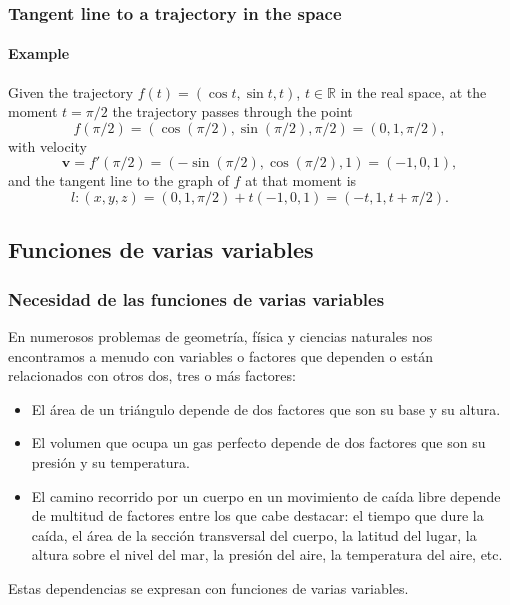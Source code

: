 \begin{frame}
\frametitle{Tangent line to a trajectory in the space}
\framesubtitle{Example}
Given the trajectory $f(t)=(\cos t, \sin t, t)$, $t\in \mathbb{R}$ in the real space, at the moment $t=\pi/2$ the trajectory passes through the point
\[
f(\pi/2)=(\cos(\pi/2),\sin(\pi/2),\pi/2)=(0,1,\pi/2),
\]
with velocity
\[
\mathbf{v}=f'(\pi/2)=(-\sin(\pi/2),\cos(\pi/2), 1)=(-1,0,1),
\] 
and the tangent line to the graph of $f$ at that moment is 
\[
l:(x,y,z)=(0,1,\pi/2)+t(-1,0,1) = (-t,1,t+\pi/2).
\]
\begin{center}

\end{center}
\end{frame}

\subsection{Funciones de varias variables}
\begin{frame}
\frametitle{Necesidad de las funciones de varias variables}
En numerosos problemas de geometría, física y ciencias naturales nos encontramos a menudo con variables o factores que dependen o están relacionados con otros dos, tres o más factores:
\begin{itemize}
\item El área de un triángulo depende de dos factores que son su base y su altura.
\item El volumen que ocupa un gas perfecto depende de dos factores que son su presión y su temperatura.
\item El camino recorrido por un cuerpo en un movimiento de caída libre depende de multitud de factores entre los que cabe destacar: el tiempo que dure la caída, el área de la sección transversal del cuerpo, la latitud del lugar, la altura sobre el nivel del mar, la presión del aire, la temperatura del aire, etc.
\end{itemize}
Estas dependencias se expresan con funciones de varias variables.
\end{frame}


